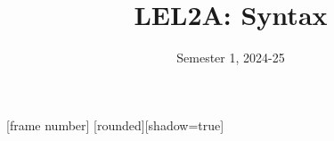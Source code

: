 \usepackage{hyperref} %
\usepackage{graphicx} %
\usepackage[linguistics]{forest} %
\usepackage{multicol} %
\usepackage{gb4e} %
\primebars %
\noautomath
\usepackage{tipa} %
\usepackage[T1]{fontenc} %
\usepackage[utf8]{inputenc}
\usepackage[normalem]{ulem} %
\usepackage{setspace}
\usepackage{pifont} %

\title{LEL2A: Syntax}
\date{Semester 1, 2024-25}%


[frame number]
[rounded][shadow=true]

\newcommand{\cmark}{\ding{51}}
\newcommand{\xmark}{\ding{55}}
\newcommand\trace{\rule[-0.5ex]{0.5cm}{.4pt}}

